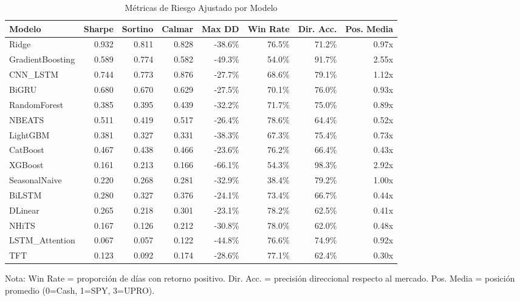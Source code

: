 \begin{table}[htbp]
\centering
\caption{M\'etricas de Riesgo Ajustado por Modelo}
\label{tab:risk_metrics}
\small
\begin{tabular}{@{}lrrrrrrr@{}}
\toprule
\textbf{Modelo} & \textbf{Sharpe} & \textbf{Sortino} & \textbf{Calmar} & \textbf{Max DD} & \textbf{Win Rate} & \textbf{Dir. Acc.} & \textbf{Pos. Media} \\
\midrule
Ridge & 0.932 & 0.811 & 0.828 & -38.6\% & 76.5\% & 71.2\% & 0.97x \\
GradientBoosting & 0.589 & 0.774 & 0.582 & -49.3\% & 54.0\% & 91.7\% & 2.55x \\
CNN\_LSTM & 0.744 & 0.773 & 0.876 & -27.7\% & 68.6\% & 79.1\% & 1.12x \\
BiGRU & 0.680 & 0.670 & 0.629 & -27.5\% & 70.1\% & 76.0\% & 0.93x \\
RandomForest & 0.385 & 0.395 & 0.439 & -32.2\% & 71.7\% & 75.0\% & 0.89x \\
NBEATS & 0.511 & 0.419 & 0.517 & -26.4\% & 78.6\% & 64.4\% & 0.52x \\
LightGBM & 0.381 & 0.327 & 0.331 & -38.3\% & 67.3\% & 75.4\% & 0.73x \\
CatBoost & 0.467 & 0.438 & 0.466 & -23.6\% & 76.2\% & 66.4\% & 0.43x \\
XGBoost & 0.161 & 0.213 & 0.166 & -66.1\% & 54.3\% & 98.3\% & 2.92x \\
SeasonalNaive & 0.220 & 0.268 & 0.281 & -32.9\% & 38.4\% & 79.2\% & 1.00x \\
BiLSTM & 0.280 & 0.327 & 0.376 & -24.1\% & 73.4\% & 66.7\% & 0.44x \\
DLinear & 0.265 & 0.218 & 0.301 & -23.1\% & 78.2\% & 62.5\% & 0.41x \\
NHiTS & 0.167 & 0.126 & 0.212 & -30.8\% & 78.0\% & 62.0\% & 0.48x \\
LSTM\_Attention & 0.067 & 0.057 & 0.122 & -44.8\% & 76.6\% & 74.9\% & 0.92x \\
TFT & 0.123 & 0.092 & 0.174 & -28.6\% & 77.1\% & 62.4\% & 0.30x \\
\bottomrule
\end{tabular}
\begin{tablenotes}
\small
\item Nota: Win Rate = proporci\'on de d\'ias con retorno positivo. Dir. Acc. = precisi\'on direccional respecto al mercado. Pos. Media = posici\'on promedio (0=Cash, 1=SPY, 3=UPRO).
\end{tablenotes}
\end{table}
